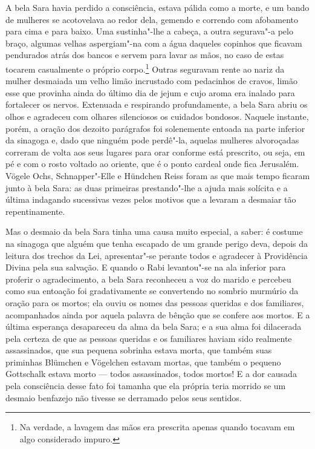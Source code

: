 A bela Sara havia perdido a consciência, estava pálida como a morte, e
um bando de mulheres se acotovelava ao redor dela, gemendo e correndo
com afobamento para cima e para baixo. Uma sustinha"-lhe a cabeça, a
outra segurava"-a pelo braço, algumas velhas aspergiam"-na com a água
daqueles copinhos que ficavam pendurados atrás dos bancos e servem para
lavar as mãos, no caso de estas tocarem casualmente o próprio
corpo.\footnote{ Na
verdade, a lavagem das mãos era prescrita apenas quando tocavam em algo
considerado impuro.}
 Outras seguravam rente ao nariz da mulher desmaiada um velho limão
incrustado com pedacinhos de cravos, limão esse que provinha ainda do
último dia de jejum e cujo aroma era inalado para fortalecer os nervos.
Extenuada e respirando profundamente, a bela Sara abriu os olhos e
agradeceu com olhares silenciosos os cuidados bondosos. Naquele
instante, porém, a oração dos dezoito parágrafos foi solenemente
entoada na parte inferior da sinagoga e, dado que ninguém pode
perdê"-la, aquelas mulheres alvoroçadas correram de volta aos seus
lugares para orar conforme está prescrito, ou seja, em pé e com o rosto
voltado ao oriente, que é o ponto cardeal onde fica Jerusalém. Vögele
Ochs, Schnapper"-Elle e Hündchen Reiss foram as que mais tempo ficaram
junto à bela Sara: as duas primeiras prestando"-lhe a ajuda mais
solícita e a última indagando sucessivas vezes pelos motivos que a
levaram a desmaiar tão repentinamente.

Mas o desmaio da bela Sara tinha uma causa muito especial, a saber: é
costume na sinagoga que alguém que tenha escapado de um grande perigo
deva, depois da leitura dos trechos da Lei, apresentar"-se perante
todos e agradecer à Providência Divina pela sua salvação. E quando o
Rabi levantou"-se na ala inferior para proferir o agradecimento, a
bela Sara reconheceu a voz do marido e percebeu como sua entoação foi
gradativamente se convertendo no sombrio murmúrio da oração para os
mortos; ela ouviu os nomes das pessoas queridas e dos familiares,
acompanhados ainda por aquela palavra de bênção que se confere aos
mortos. E a última esperança desapareceu da alma da bela Sara; e a sua
alma foi dilacerada pela certeza de que as pessoas queridas e os
familiares haviam sido realmente assassinados, que sua pequena sobrinha
estava morta, que também suas priminhas Blümchen e Vögelchen estavam
mortas, que também o pequeno Gottschalk estava morto --- todos
assassinados, todos mortos! E a dor causada pela consciência desse fato
foi tamanha que ela própria teria morrido se um desmaio benfazejo não
tivesse se derramado pelos seus sentidos.



